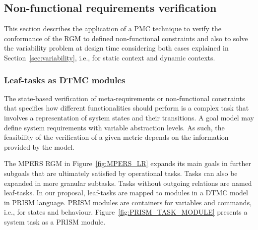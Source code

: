 \subsection{Non-functional requirements verification}


This section describes the application of a PMC technique to verify the conformance of the RGM to defined non-functional constraints and also to solve the variability problem at design time considering both cases explained in Section~\ref{sec:variability}, i.e., for static context and dynamic contexts.

\subsubsection{Leaf-tasks as DTMC modules}


The state-based verification of meta-requirements or non-functional constraints that specifies how different functionalities should perform is a complex task that involves a representation of system states and their transitions. A goal model may define system requirements with variable abstraction levels. As such, the feasibility of the verification of a given metric depends on the information provided by the model.

The MPERS RGM in Figure~\ref{fig:MPERS_LR} expands its main goals in further subgoals that are ultimately satisfied by operational tasks. Tasks can also be expanded in more granular subtasks. Tasks without outgoing relations are named leaf-tasks. In our proposal, leaf-tasks are mapped to modules in a DTMC model in PRISM language. PRISM modules are containers for variables and commands, i.e., for states and behaviour. Figure~\ref{fig:PRISM_TASK_MODULE} presents a system task as a PRISM module.

